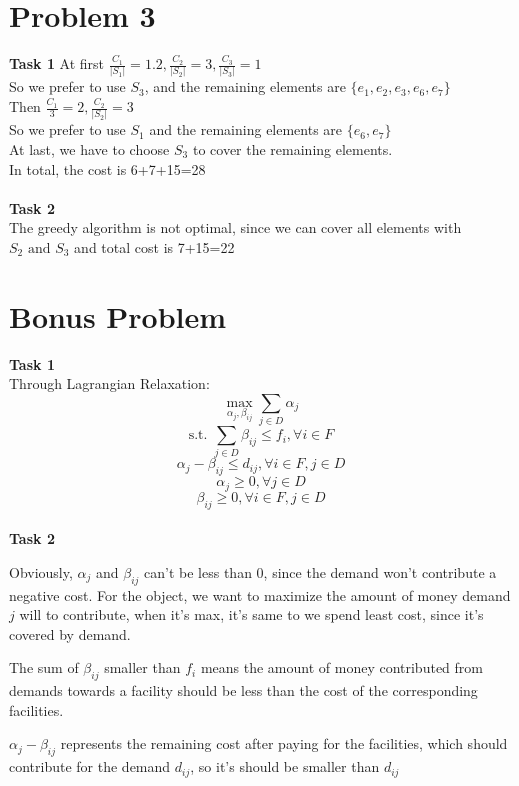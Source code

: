 \documentclass[a4paper]{article}
\begin{document}
\section{Problem 3}
\noindent\textbf{Task 1}
At first $\frac{C_1}{|S_1|}=1.2,\frac{C_2}{|S_2|}=3,\frac{C_3}{|S_3|}=1$
\\So we prefer to use $S_3$, and the remaining elements are $\{e_1,e_2,e_3,e_6,e_7\}$
\\Then $\frac{C_1}{3}=2,\frac{C_2}{|S_2|}=3$
\\So we prefer to use $S_1$ and the remaining elements are $\{e_6,e_7\}$
\\At last, we have to choose $S_3$ to cover the remaining elements.
\\In total, the cost is 6+7+15=28
\\\\ \textbf{Task 2}
\\The greedy algorithm is not optimal, since we can cover all elements with $S_2\text{ and }S_3$ and total cost is 7+15=22
\section{Bonus Problem}
\noindent \textbf{Task 1}
\\Through Lagrangian Relaxation:
$$\max_{\alpha_j,\beta_{ij}}\sum_{j\in D}\alpha_j$$
$$\text{s.t. }\sum_{j\in D}\beta_{ij}\leq f_i,\forall i\in F$$
$$\alpha_j-\beta_{ij}\leq d_{ij},\forall i\in F,j\in D$$
$$\alpha_j\geq0,\forall j\in D$$
$$\beta_{ij}\geq0,\forall i\in F,j\in D$$
\\ \textbf{Task 2}
\par Obviously, $\alpha_j$ and $\beta_{ij}$ can't be less than 0, since the demand won't contribute a negative cost. For the object, we want to maximize the amount of money demand $j$ will to contribute, when it's max, it's same to we spend least cost, since it's covered by demand.
\par The sum of $\beta_{ij}$ smaller than $f_i$ means the amount of money contributed from demands towards a facility should be less than the cost of the corresponding facilities.
\par $\alpha_j-\beta_{ij}$ represents the remaining cost after paying for the facilities, which should contribute for the demand $d_{ij}$, so it's should be smaller than $d_{ij}$ 
\end{document}
